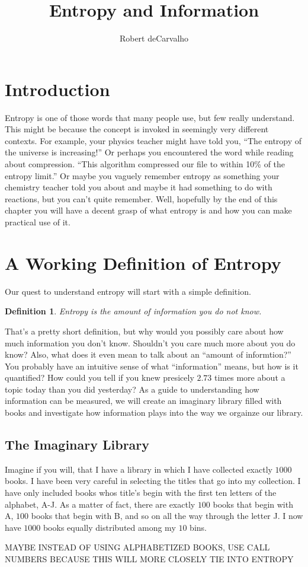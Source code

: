 \documentclass[11pt, oneside]{article}   	%
\title{Entropy and Information}
\author{Robert deCarvalho}
\date{}							%
\newtheorem{definition}{Definition}
\begin{document}
\maketitle


\section{Introduction}
Entropy is one of those words that many people use, but few really understand.
This might be because the concept is invoked in seemingly very different
contexts.  For example, your physics teacher might have told you, ``The entropy
of the universe is increasing!'' Or perhaps you encountered the word while
reading about compression. ``This algorithm compressed our file to within
10\% of the entropy limit.''  Or maybe you vaguely remember entropy as something
your chemistry teacher told you about and maybe it had something to do with
reactions, but you can't quite remember.  Well, hopefully by the end of this
chapter you will have a decent grasp of what entropy is and how you can make
practical use of it.


\section{A Working Definition of Entropy}
Our quest to understand entropy will start with a simple definition.
\begin{definition}
    Entropy is the amount of information you do not know.
\end{definition}
That's a pretty short definition, but why would you possibly care about how much
information you don't know.  Shouldn't you care much more about you do know?
Also, what does it even mean to talk about an ``amount of informtion?'' You
probably have an intuitive sense of what ``information'' means, but how is it
quantified?  How could you tell if you knew presicely $2.73$ times more about a
topic today than you did yesterday?  As a guide to understanding how information
can be measured, we will create an imaginary library filled with books and
investigate how information plays into the way we orgainze our library.


\subsection{The Imaginary Library}
Imagine if you will, that I have a library in which I have collected exactly
$1000$ books. I have been very careful in selecting the titles that go into my
collection. I have only included books whos title's begin with the first ten
letters of the alphabet, A-J. As a matter of fact, there are exactly $100$ books
that begin with A, $100$ books that begin with B, and so on all the way through
the letter J.  I now have $1000$ books equally distributed among my $10$ bins.

MAYBE INSTEAD OF USING ALPHABETIZED BOOKS, USE CALL NUMBERS BECAUSE THIS
WILL MORE CLOSELY TIE INTO ENTROPY
\end{document}

